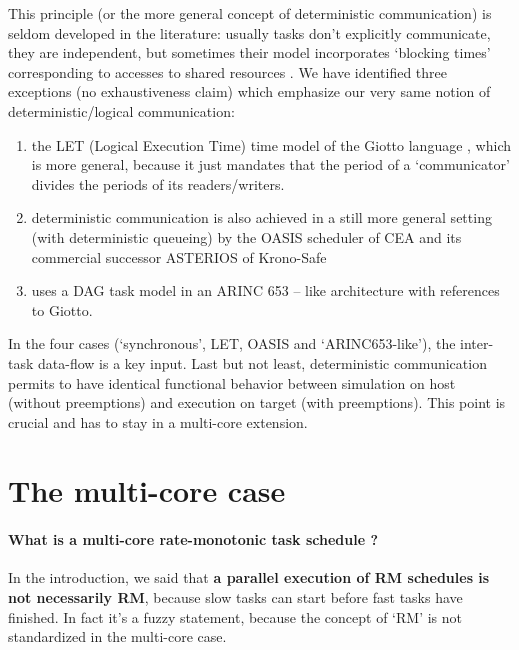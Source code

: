 \documentclass[a4paper]{article}
\begin{document}
This principle (or the more general concept of
deterministic communication) is seldom developed in the literature: usually tasks don’t explicitly communicate, they are
 independent, but sometimes their model incorporates ‘blocking times’
corresponding to accesses to shared resources \cite{DBLP:journals/csur/DavisB11}.
We have identified three exceptions (no exhaustiveness claim) which emphasize our very same notion of deterministic/logical communication:
\begin{enumerate}
\item
the LET (Logical Execution Time) time model of the Giotto language \cite{DBLP:conf/birthday/KirschS12},
which is more general, because it just mandates that the period of a
‘communicator’ divides the periods of its readers/writers.
\item
deterministic communication is also achieved
in a still more general setting (with deterministic queueing) by the OASIS scheduler of CEA \cite{DBLP:conf/pdcs/ChabrolDALD05} and its
commercial successor ASTERIOS of Krono-Safe %
\item
\cite{DBLP:journals/lites/CarlePSL15} uses a DAG task model in an ARINC
653 – like architecture with references to Giotto.
\end{enumerate}
In the four cases (‘synchronous’, LET,
OASIS and ‘ARINC653-like’), the inter-task data-flow is a key input.
Last but not least, deterministic communication permits to have identical functional
behavior between simulation on host (without preemptions) and execution on target (with preemptions).
This point is crucial and has to stay in a multi-core extension.


\section{The multi-core case} \label{section:multi-core}

\paragraph*{What is a multi-core rate-monotonic task schedule ?}

In the introduction, we said that
\textbf{a parallel execution of RM schedules is not necessarily RM},
because slow tasks can start before fast tasks have finished.
In fact it's a fuzzy statement, because the concept of `RM' is not standardized in the multi-core case.
\end{document}
